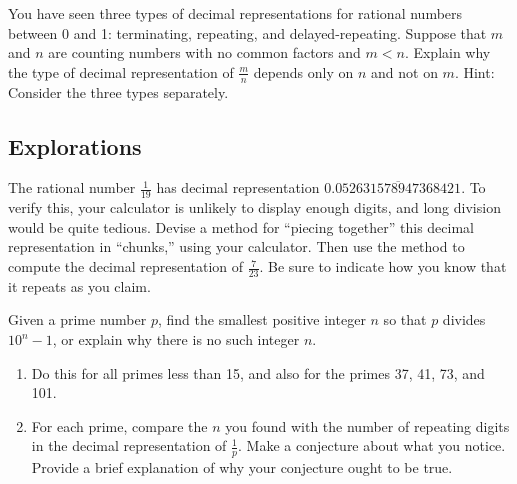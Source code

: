 \documentclass[nooutcomes]{ximera}
\begin{document}
\begin{problem}
You have seen three types of decimal representations for rational numbers between 0 and 1:  terminating, repeating, and delayed-repeating.  Suppose that $m$ and $n$ are counting numbers with no common factors and $m<n$.  Explain why the type of decimal representation of $\frac{m}{n}$ depends only on $n$ and not on $m$.  Hint:  Consider the three types separately.  
\end{problem}

\subsection*{Explorations}

\begin{problem}
The rational number $\frac{1}{19}$ has decimal representation $0.\overline{052631578947368421}$.  To verify this, your calculator is unlikely to display enough digits, and long division would be quite tedious.  Devise a method for ``piecing together'' this decimal representation in ``chunks,'' using your calculator.  Then use the method to compute the decimal representation of $\frac{7}{23}$.  Be sure to indicate how you know that it repeats as you claim.  
\end{problem}

\begin{problem}
Given a prime number $p$, find the smallest positive integer $n$ so that $p$ divides $10^n-1$, or explain why there is no such integer $n$.  
\begin{enumerate}
\item Do this for all primes less than 15, and also for the primes 37, 41, 73, and 101.
\item For each prime, compare the $n$ you found with the number of repeating digits in the decimal representation of $\frac{1}{p}$.  
Make a conjecture about what you notice.  Provide a brief explanation of why your conjecture ought to be true. 
\end{enumerate}
\end{problem}

\end{document}

